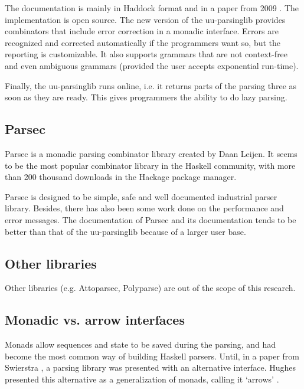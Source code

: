 The documentation is mainly in Haddock format and in a paper from 2009 \cite{uu-doc}.
The implementation is open source.
The new version of the uu-parsinglib provides combinators that include error correction in a monadic interface.
Errors are recognized and corrected automatically if the programmers want so, but the reporting is customizable.
It also supports grammars that are not context-free and even ambiguous grammars (provided the user accepts exponential run-time).

Finally, the uu-parsinglib runs online, i.e. it returns parts of the parsing three as soon as they are ready.
This gives programmers the ability to do lazy parsing.

\subsection{Parsec}
%
Parsec is a monadic parsing combinator library created by Daan Leijen.
It seems to be the most popular combinator library in the Haskell community, with more than 200 thousand downloads in the Hackage package manager.

Parsec is designed to be simple, safe and well documented industrial parser library.
Besides, there has also been some work done on the performance and error messages.
The documentation of Parsec and its documentation tends to be better than that of the uu-parsinglib because of a larger user base.


\subsection{Other libraries}
Other libraries (e.g. Attoparsec, Polyparse) are out of the scope of this research.

\subsection{Monadic vs. arrow interfaces}
Monads allow sequences and state to be saved during the parsing, and had become the most common way of building Haskell parsers.
Until, in a paper from Swierstra \cite{error-correcting}, a parsing library was presented with an alternative interface.
Hughes presented this alternative as a generalization of monads, calling it `arrows' \cite{monad-arrows}.

